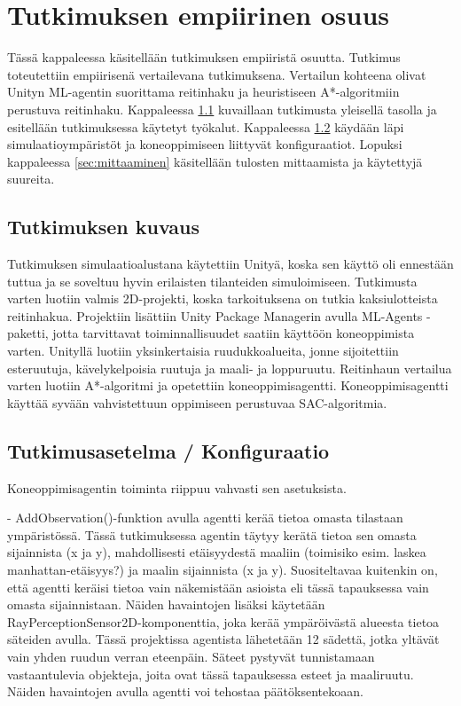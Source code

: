 \documentclass[utf8]{gradu3}
\begin{document}
\chapter{Tutkimuksen empiirinen osuus}

Tässä kappaleessa käsitellään tutkimuksen empiiristä osuutta. Tutkimus toteutettiin empiirisenä vertailevana tutkimuksena. Vertailun kohteena olivat Unityn ML-agentin suorittama reitinhaku ja heuristiseen A*-algoritmiin perustuva reitinhaku. Kappaleessa \ref{sec:tutkimuksenkuvaus} kuvaillaan tutkimusta yleisellä tasolla ja esitellään tutkimuksessa käytetyt työkalut. Kappaleessa \ref{sec:tutkimusasetelma} käydään läpi simulaatioympäristöt ja koneoppimiseen liittyvät konfiguraatiot. Lopuksi kappaleessa \ref{sec:mittaaminen} käsitellään tulosten mittaamista ja käytettyjä suureita.

\section{Tutkimuksen kuvaus}
\label{sec:tutkimuksenkuvaus}

Tutkimuksen simulaatioalustana käytettiin Unityä, koska sen käyttö oli ennestään tuttua ja se soveltuu hyvin erilaisten tilanteiden simuloimiseen. Tutkimusta varten luotiin valmis 2D-projekti, koska tarkoituksena on tutkia kaksiulotteista reitinhakua. Projektiin lisättiin Unity Package Managerin avulla ML-Agents -paketti, jotta tarvittavat toiminnallisuudet saatiin käyttöön koneoppimista varten. Unityllä luotiin yksinkertaisia ruudukkoalueita, jonne sijoitettiin esteruutuja, kävelykelpoisia ruutuja ja maali- ja loppuruutu. Reitinhaun vertailua varten luotiin A*-algoritmi ja opetettiin koneoppimisagentti. Koneoppimisagentti käyttää syvään vahvistettuun oppimiseen perustuvaa SAC-algoritmia.

\section{Tutkimusasetelma / Konfiguraatio}
\label{sec:tutkimusasetelma}

Koneoppimisagentin toiminta riippuu vahvasti sen asetuksista.

- AddObservation()-funktion avulla agentti kerää tietoa omasta tilastaan ympäristössä. Tässä tutkimuksessa agentin täytyy kerätä tietoa sen omasta sijainnista (x ja y), mahdollisesti etäisyydestä maaliin (toimisiko esim. laskea manhattan-etäisyys?) ja maalin sijainnista (x ja y). Suositeltavaa kuitenkin on, että agentti keräisi tietoa vain näkemistään asioista eli tässä tapauksessa vain omasta sijainnistaan. Näiden havaintojen lisäksi käytetään RayPerceptionSensor2D-komponenttia, joka kerää ympäröivästä alueesta tietoa säteiden avulla. Tässä projektissa agentista lähetetään 12 sädettä, jotka yltävät vain yhden ruudun verran eteenpäin. Säteet pystyvät tunnistamaan vastaantulevia objekteja, joita ovat tässä tapauksessa esteet ja maaliruutu. Näiden havaintojen avulla agentti voi tehostaa päätöksentekoaan.
\end{document}
